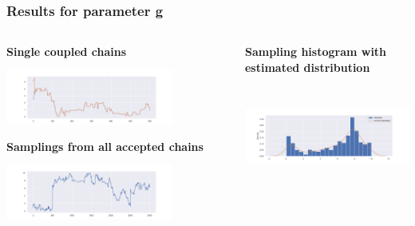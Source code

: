 \documentclass{beamer}
\begin{document}
%			
\begin{frame}
	\frametitle{Results for parameter g}
	\begin{columns}
		\begin{column}{0.4\textwidth}
			{\scriptsize \centering \textbf{Single coupled chains}}\\
			\includegraphics[width=5.5cm,height=2.5cm]{gk_all_pack/gk_all_chain_meeeting_2}
			\vspace{0.2cm}
			{\scriptsize \centering \textbf{Samplings from all accepted chains}}\\
			\includegraphics[width=5.5cm,height=2.5cm]{gk_all_pack/gk_all_sampling_2}
		\end{column}
		\begin{column}{0.4\textwidth}
			{	\scriptsize \hspace{1cm} \textbf{Sampling histogram with estimated distribution }}\\
			\includegraphics[width=6cm,height=4cm]{gk_all_pack/gk_all_histogram_kernel_2}
			
		\end{column}
	\end{columns}
\end{frame}
\end{document}
